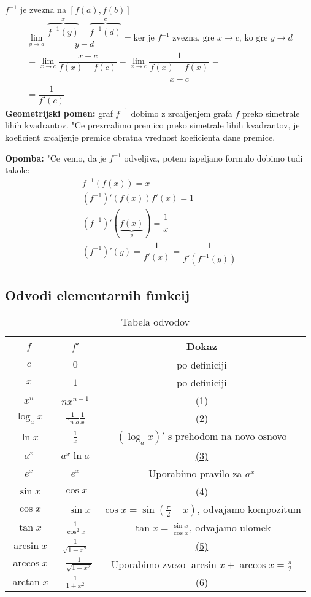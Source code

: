 $f^{-1}$ je zvezna na $[f(a), f(b)]$
\begin{multline*}
\lim_{y \to d} \dfrac{\overbrace{f^{-1}(y)}^x - \overbrace{f^{-1}(d)}^c}{y-d} = \text{ker je $f^{-1}$ zvezna, gre $x \to c$, ko gre $y \to d$}\\
= \lim_{x \to c} \dfrac{x - c}{f(x) - f(c)} = \lim_{x \to c} \dfrac{1}{\dfrac{f(x) - f(x)}{x - c}} = \\
= \dfrac{1}{f'(c)}
\end{multline*}
\textbf{Geometrijski pomen:} graf $f^{-1}$ dobimo z zrcaljenjem grafa $f$ preko simetrale lihih kvadrantov. "Ce prezrcalimo premico preko simetrale lihih kvadrantov, je koeficient zrcaljenje premice obratna vrednost koeficienta dane premice.

\textbf{Opomba:} "Ce vemo, da je $f^{-1}$ odveljiva, potem izpeljano formulo dobimo tudi takole:
\begin{gather*}
f^{-1}(f(x)) = x \\
(f^{-1})'(f(x)) f'(x) = 1 \\
(f^{-1})'(\underbrace{f(x)}_y) = \dfrac{1}{x} \\
(f^{-1})'(y) = \dfrac{1}{f'(x)} = \dfrac{1}{f'(f^{-1}(y))}
\end{gather*}
%
\subsection{Odvodi elementarnih funkcij}
\begin{table}[!htbp]
	\centering
	\begin{tabular}{c|c|c}
		$f$ & $f'$ & Dokaz \\ \hline
		$c$ & $0$ & po definiciji \\
		$x$ & $1$ & po definiciji \\
		$x^n$ & $n x^{n-1}$ & \hyperref[proof:1]{(1)}\\
		$\log_a x$ & $\frac{1}{\ln a} \frac{1}{x}$ &  \hyperref[proof:2]{(2)} \\
		$\ln x$ & $\frac{1}{x}$ & $(\log_a x)'$ s prehodom na novo osnovo\\
		$a^x$ & $a^x \ln a$ &  \hyperref[proof:3]{(3)} \\
		$e^x$ & $e^x$ & Uporabimo pravilo za $a^x$ \\
		$\sin x$ & $\cos x$ & \hyperref[proof:4]{(4)} \\
		$\cos x$ & $- \sin x$ & $\cos x = \sin(\frac{\pi}{2} - x)$, odvajamo kompozitum\\
		$\tan x$ & $\frac{1}{\cos^2 x}$ & $\tan x = \frac{\sin x}{\cos x}$, odvajamo ulomek\\
		$\arcsin x$ & $\frac{1}{\sqrt{1 - x^2}}$ & \hyperref[proof:5]{(5)} \\
		$\arccos x$ & $- \frac{1}{\sqrt{1 - x^2}}$ & Uporabimo zvezo $\arcsin x + \arccos x = \frac{\pi}{2}$\\
		$\arctan x$ & $\frac{1}{1 + x^2}$ & \hyperref[proof:6]{(6)} 
	\end{tabular}
	\caption{Tabela odvodov}
\end{table}

